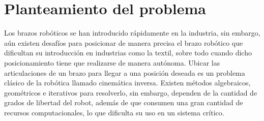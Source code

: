 \section{Planteamiento del problema}

Los brazos robóticos se han introducido rápidamente en la industria, sin embargo, aún existen desafíos para posicionar de manera precisa el brazo robótico que dificultan su introducción en industrias como la textil, sobre todo cuando dicho posicionamiento tiene que realizarse de manera autónoma.
\newline\newline\newline
Ubicar las articulaciones de un brazo para llegar a una posición deseada es un problema clásico de la robótica llamado cinemática inversa. Existen métodos algebraicos, geométricos e iterativos para resolverlo, sin embargo, dependen de la cantidad de grados de libertad del robot, además de que consumen una gran cantidad de recursos computacionales, lo que dificulta su uso en un sistema crítico.